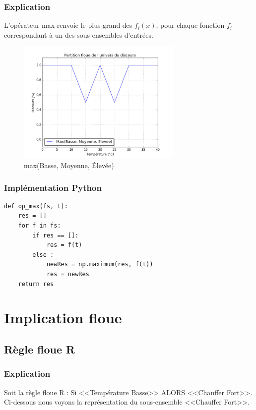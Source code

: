 \documentclass[a4paper]{article}
\begin{document}
\subsubsection{Explication}
L'opérateur max renvoie le plus grand des $f_i(x)$, pour chaque fonction $f_i$ correspondant à un des sous-ensembles d'entrées.

\begin{figure}[h]
\begin{center}
	\includegraphics[width=300px]{plot_test_max.png}
\end{center}
\caption{max(Basse, Moyenne, Élevée)}
\end{figure}

\subsubsection{Implémentation Python}
\begin{lstlisting}
def op_max(fs, t):
    res = []
    for f in fs:
        if res == []:
            res = f(t)
        else :
            newRes = np.maximum(res, f(t))
            res = newRes
    return res
\end{lstlisting}

\clearpage
\section{Implication floue}

\subsection{Règle floue R}

\subsubsection{Explication}
Soit la règle floue R : Si <<Température Basse>> ALORS <<Chauffer Fort>>.\\
Ci-dessous nous voyons la représentation du sous-ensemble <<Chauffer Fort>>.
\end{document}
